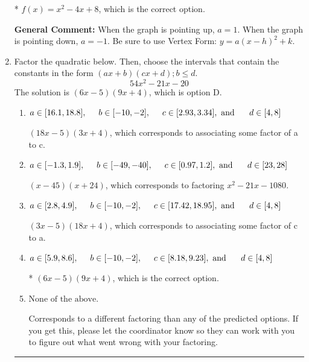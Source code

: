 \documentclass{extbook}[14pt]
\newcommand{\litem}[1]{\item #1

\rule{\textwidth}{0.4pt}}
\begin{document}
\begin{enumerate}
{\begin{enumerate}[label=\Alph*.]
* $f(x)=x^{2} -4 x + 8$, which is the correct option.
\end{enumerate}

\textbf{General Comment:} When the graph is pointing up, $a=1$. When the graph is pointing down, $a=-1$. Be sure to use Vertex Form: $y = a(x-h)^2+k$.
}
\litem{
Factor the quadratic below. Then, choose the intervals that contain the constants in the form $(ax+b)(cx+d); b \leq d.$
\[ 54x^{2} -21 x -20 \]The solution is \( (6x -5)(9x + 4) \), which is option D.\begin{enumerate}[label=\Alph*.]
\item \( a \in [16.1, 18.8], \hspace*{5mm} b \in [-10, -2], \hspace*{5mm} c \in [2.93, 3.34], \text{ and } \hspace*{5mm} d \in [4, 8] \)

 $(18x -5)(3x + 4)$, which corresponds to associating some factor of a to c.
\item \( a \in [-1.3, 1.9], \hspace*{5mm} b \in [-49, -40], \hspace*{5mm} c \in [0.97, 1.2], \text{ and } \hspace*{5mm} d \in [23, 28] \)

 $(x -45)(x + 24)$, which corresponds to factoring $x^{2} -21 x -1080$.
\item \( a \in [2.8, 4.9], \hspace*{5mm} b \in [-10, -2], \hspace*{5mm} c \in [17.42, 18.95], \text{ and } \hspace*{5mm} d \in [4, 8] \)

 $(3x -5)(18x + 4)$, which corresponds to associating some factor of c to a.
\item \( a \in [5.9, 8.6], \hspace*{5mm} b \in [-10, -2], \hspace*{5mm} c \in [8.18, 9.23], \text{ and } \hspace*{5mm} d \in [4, 8] \)

* $(6x -5)(9x + 4)$, which is the correct option.
\item \( \text{None of the above.} \)

 Corresponds to a different factoring than any of the predicted options. If you get this, please let the coordinator know so they can work with you to figure out what went wrong with your factoring.
\end{enumerate}

}
\end{enumerate}
\end{document}
